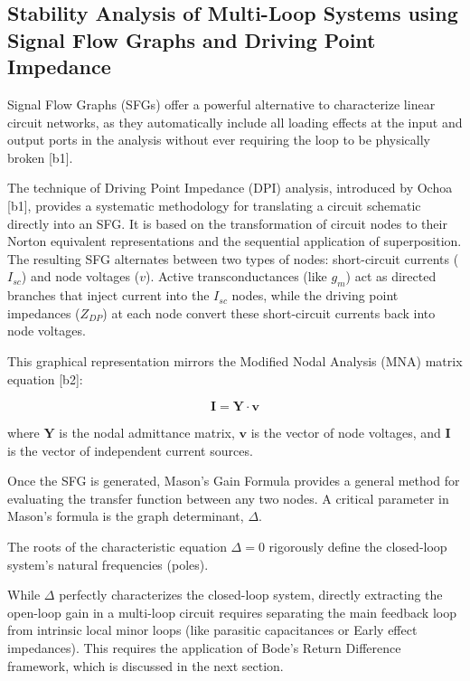 \documentclass[
]{article}
\begin{document}
\subsection{Stability Analysis of Multi-Loop Systems using Signal Flow
Graphs and Driving Point
Impedance}\label{_stability_analysis_of_multi_loop_systems_using_signal_flow_graphs_and_driving_point_impedance}

Signal Flow Graphs (SFGs) offer a powerful alternative to characterize
linear circuit networks, as they automatically include all loading
effects at the input and output ports in the analysis without ever
requiring the loop to be physically broken {[}b1{]}.

The technique of Driving Point Impedance (DPI) analysis, introduced by
Ochoa {[}b1{]}, provides a systematic methodology for translating a
circuit schematic directly into an SFG. It is based on the
transformation of circuit nodes to their Norton equivalent
representations and the sequential application of superposition. The
resulting SFG alternates between two types of nodes: short-circuit
currents (\(I_{sc}\)) and node voltages (\(v\)). Active
transconductances (like \(g_m\)) act as directed branches that inject
current into the \(I_{sc}\) nodes, while the driving point impedances
(\(Z_{DP}\)) at each node convert these short-circuit currents back into
node voltages.

This graphical representation mirrors the Modified Nodal Analysis (MNA)
matrix equation {[}b2{]}:

\begin{equation}
    \mathbf{I} = \mathbf{Y} \cdot \mathbf{v}
    \label{eq:MNA_matrix}
\end{equation}

where \(\mathbf{Y}\) is the nodal admittance matrix, \(\mathbf{v}\) is
the vector of node voltages, and \(\mathbf{I}\) is the vector of
independent current sources.

Once the SFG is generated, Mason's Gain Formula provides a general
method for evaluating the transfer function between any two nodes. A
critical parameter in Mason's formula is the graph determinant,
\(\Delta\).

The roots of the characteristic equation \(\Delta = 0\) rigorously
define the closed-loop system's natural frequencies (poles).

While \(\Delta\) perfectly characterizes the closed-loop system,
directly extracting the open-loop gain in a multi-loop circuit requires
separating the main feedback loop from intrinsic local minor loops (like
parasitic capacitances or Early effect impedances). This requires the
application of Bode's Return Difference framework, which is discussed in
the next section.
\end{document}
